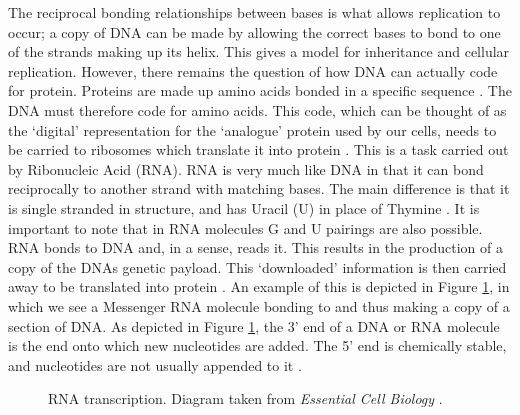 \documentclass{cshonours}
\begin{document}
The reciprocal bonding relationships between bases is what allows replication to occur; a copy of DNA can be made by allowing the correct bases to bond to one of the strands making up its helix. This gives a model for inheritance and cellular replication. However, there remains the question of how DNA can actually code for protein. Proteins are made up amino acids bonded in a specific sequence \cite{albertsessential}. The DNA must therefore code for amino acids. This code, which can be thought of as the `digital' representation for the `analogue' protein used by our cells, needs to be carried to ribosomes which translate it into protein \cite{albertsessential}. This is a task carried out by Ribonucleic Acid (RNA). RNA is very much like DNA in that it can bond reciprocally to another strand with matching bases. The main difference is that it is single stranded in structure, and has Uracil (U) in place of Thymine \cite{albertsessential}. It is important to note that in RNA molecules G and U pairings are also possible. RNA bonds to DNA and, in a sense, reads it. This results in the production of a copy of the DNAs genetic payload. This `downloaded' information is then carried away to be translated into protein \cite{albertsessential}. An example of this is depicted in Figure \ref{transcription}, in which we see a Messenger RNA molecule bonding to and thus making a copy of a section of DNA. As depicted in Figure \ref{transcription}, the 3' end of a DNA or RNA molecule is the end onto which new nucleotides are added. The 5' end is chemically stable, and nucleotides are not usually appended to it \cite{albertsessential}.

\begin{figure}
\begin{center}
\end{center}
\caption{RNA transcription. Diagram taken from \emph{Essential Cell Biology} \cite{albertsessential}.}
\label{transcription}
\end{figure}
\end{document}
